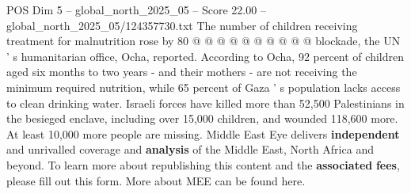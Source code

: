 \begin{textsample}{POS Dim 5 – global\_north\_2025\_05 – Score 22.00 – global\_north\_2025\_05/124357730.txt}
The number of children receiving treatment for malnutrition rose by 80 @ @ @ @ @ @ @ @ @ @ blockade, the UN ' s humanitarian office, Ocha, reported.
According to Ocha, 92 percent of children aged six months to two years - and their mothers - are not receiving the minimum required nutrition, while 65 percent of Gaza ' s population lacks access to clean drinking water.
Israeli forces have killed more than 52,500 Palestinians in the besieged enclave, including over 15,000 children, and wounded 118,600 more.
At least 10,000 more people are missing.
Middle East Eye delivers \textbf{independent} and unrivalled coverage and \textbf{analysis} of the Middle East, North Africa and beyond.
To learn more about republishing this content and the \textbf{associated} \textbf{fees}, please fill out this form.
More about MEE can be found here.

\end{textsample}
